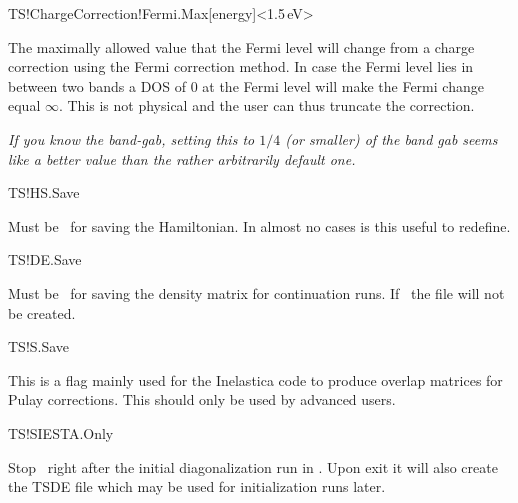 \begin{fdfentry}{TS!ChargeCorrection!Fermi.Max}[energy]<1.5\,eV>%

  The maximally allowed value that the Fermi level will change from a
  charge correction using the Fermi correction method. In case the
  Fermi level lies in between two bands a DOS of $0$ at the Fermi
  level will make the Fermi change equal $\infty$. This is not
  physical and the user can thus truncate the correction.
  
  \emph{If you know the band-gab, setting this to $1/4$ (or smaller)
      of the band gab seems like a better value than the rather
      arbitrarily default one.}

\end{fdfentry}

\begin{fdflogicalT}{TS!HS.Save}

  Must be \fdftrue\ for saving the Hamiltonian. In almost no cases
  is this useful to redefine.

\end{fdflogicalT}  

\begin{fdflogicalT}{TS!DE.Save}

  Must be \fdftrue\ for saving the density matrix for continuation
  runs. If \fdffalse\ the  file will not be created.

\end{fdflogicalT}  

\begin{fdflogicalF}{TS!S.Save}

  This is a flag mainly used for the Inelastica code to produce
  overlap matrices for Pulay corrections. This should only be used by
  advanced users.

\end{fdflogicalF}


\begin{fdflogicalF}{TS!SIESTA.Only}

  Stop \tsiesta\ right after the initial diagonalization run in
  \siesta. Upon exit it will also create the TSDE file which may be
  used for initialization runs later.

\end{fdflogicalF}



